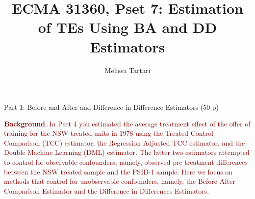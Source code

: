 \documentclass{article}
\newcommand{\psetnum}{7}
\begin{document}

\title{ECMA 31360, Pset \psetnum: Estimation of TEs Using BA and DD Estimators}
\date{}
\author{Melissa Tartari}
\maketitle
\thispagestyle{fancy}

\begin{center}
{\LARGE Part 1: Before and After and Difference in Difference Estimators (50 p)}
\end{center}

\noindent \textcolor{Maroon}{\textbf{Background}. In Pset 4 you estimated the average treatment effect of the offer of training for the NSW treated units in 1978 using the  Treated Control Comparison (TCC) estimator, the Regression Adjusted TCC estimator, and the Double Machine Learning (DML) estimator. The latter two estimators attempted to control for observable confounders, namely, observed pre-treatment differences between the NSW treated sample and the PSID-1 sample. Here we focus on methods that control for unobservable confounders, namely, the Before After Comparison Estimator and the Difference in Differences Estimators.}\\
\end{document}
